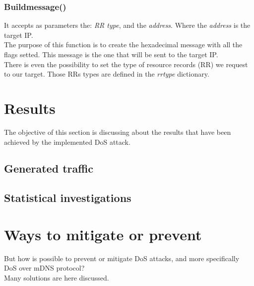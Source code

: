 \documentclass[fleqn, 10pt]{SelfArx} %
\begin{document}
\subsubsection{Build\textunderscore message()}
It accepts as parameters the: {\it{RR type}}, and the {\it{address}}. Where the {\it{address}} is the target IP. \\
The purpose of this function is to create the hexadecimal message with all the flags setted.
This message is the one that will be sent to the target IP. \\ There is even the possibility to set the type of 
resource records (RR) we request to our target. Those RRs types are defined in the {\it{rr\textunderscore type}} dictionary.


\section{Results}
The objective of this section is discussing about the results that have been achieved by the implemented DoS attack.

\subsection{Generated traffic}

\subsection{Statistical investigations}



\section{Ways to mitigate or prevent}
But how is possible to prevent or mitigate DoS attacks, and more specifically DoS over mDNS protocol? \\
Many solutions are here discussed.




\nocite{*}

\end{document}
